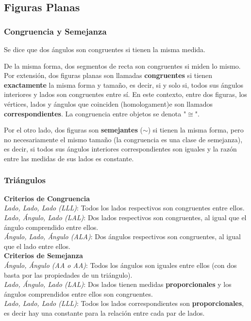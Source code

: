 \subsection{Figuras Planas}
\subsubsection{Congruencia y Semejanza}
Se dice que dos ángulos son congruentes si tienen la misma medida.

De la misma forma, dos segmentos de recta son congruentes si miden lo mismo. \\

Por extensión, dos figuras planas son llamadas \textbf{congruentes} si tienen \textbf{exactamente} la misma forma y tamaño, es decir, si y solo si, todos sus ángulos interiores y lados son congruentes entre sí.
En este contexto, entre dos figuras, los vértices, lados y ángulos que coinciden (homologament)e son llamados \textbf{correspondientes}. La congruencia entre objetos se denota "$\cong$".

Por el otro lado, dos figuras son \textbf{semejantes} ($\sim$) si tienen la misma forma, pero no necesariamente el mismo tamaño (la congruencia es una clase de semejanza), es decir, si todos sus ángulos interiores correspondientes son iguales y la razón entre las medidas de sus lados es constante.\\
\subsubsection{Triángulos}
\textbf{Criterios de Congruencia}\\
\textit{Lado, Lado, Lado (LLL)}: Todos los lados respectivos son congruentes entre ellos.\\
\textit{Lado, Ángulo, Lado (LAL)}: Dos lados respectivos son congruentes, al igual que el ángulo comprendido entre ellos.\\
\textit{Ángulo, Lado, Ángulo (ALA)}: Dos ángulos respectivos son congruentes, al igual que el lado entre ellos.\\

\textbf{Criterios de Semejanza}\\
\textit{Ángulo, Ángulo (AA o AA)}: Todos los ángulos son iguales entre ellos (con dos basta por las propiedades de un triángulo).\\
\textit{Lado, Ángulo, Lado (LAL)}: Dos lados tienen medidas \textbf{proporcionales} y los ángulos comprendidos entre ellos son congruentes.\\
\textit{Lado, Lado, Lado (LLL)}: Todos los lados correspondientes son \textbf{proporcionales}, es decir hay una constante para la relación entre cada par de lados.\\


